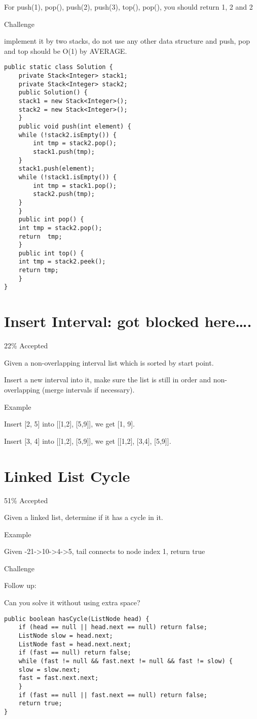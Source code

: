\documentclass[12pt]{book}
\begin{document}
For push(1), pop(), push(2), push(3), top(), pop(), you should return 1, 2 and 2

Challenge

implement it by two stacks, do not use any other data structure and
push, pop and top should be O(1) by AVERAGE.
\lstset{language=java,label= ,caption= ,numbers=none}
\begin{lstlisting}
public static class Solution {
    private Stack<Integer> stack1;
    private Stack<Integer> stack2;
    public Solution() {
	stack1 = new Stack<Integer>();
	stack2 = new Stack<Integer>();
    }
    public void push(int element) {
	while (!stack2.isEmpty()) {
	    int tmp = stack2.pop();
	    stack1.push(tmp);
	}
	stack1.push(element);
	while (!stack1.isEmpty()) {
	    int tmp = stack1.pop();
	    stack2.push(tmp);
	}
    }
    public int pop() {
	int tmp = stack2.pop();
	return  tmp;
    }
    public int top() {
	int tmp = stack2.peek();
	return tmp;
    }
}
\end{lstlisting}
\chapter{Insert Interval: got blocked here\ldots{}.}
\label{sec-32}

22\% Accepted

Given a non-overlapping interval list which is sorted by start point.

Insert a new interval into it, make sure the list is still in order and non-overlapping (merge intervals if necessary).

Example

Insert [2, 5] into [[1,2], [5,9]], we get [1, 9].

Insert [3, 4] into [[1,2], [5,9]], we get [[1,2], [3,4], [5,9]].
\chapter{Linked List Cycle}
\label{sec-33}

51\% Accepted

Given a linked list, determine if it has a cycle in it.



Example

Given -21->10->4->5, tail connects to node index 1, return true

Challenge

Follow up:

Can you solve it without using extra space?
\lstset{language=java,label= ,caption= ,numbers=none}
\begin{lstlisting}
public boolean hasCycle(ListNode head) {
    if (head == null || head.next == null) return false;
    ListNode slow = head.next;
    ListNode fast = head.next.next;
    if (fast == null) return false;
    while (fast != null && fast.next != null && fast != slow) {
	slow = slow.next;
	fast = fast.next.next;
    }
    if (fast == null || fast.next == null) return false;
    return true;
}
\end{lstlisting}
\end{document}

